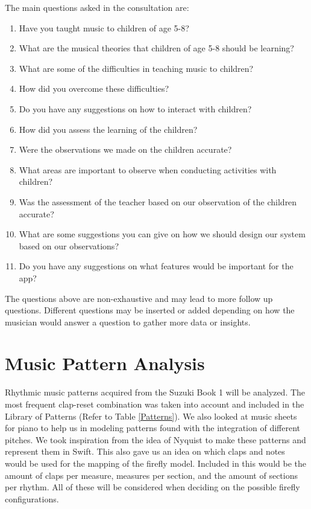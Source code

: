 The main questions asked in the consultation are:
\begin{enumerate}
    \item Have you taught music to children of age 5-8?
    \item What are the musical theories that children of age 5-8 should be learning?
    \item What are some of the difficulties in teaching music to children?
    \item How did you overcome these difficulties?
    \item Do you have any suggestions on how to interact with children?
    \item How did you assess the learning of the children?
    \item Were the observations we made on the children accurate?
    \item What areas are important to observe when conducting activities with children?
    \item Was the assessment of the teacher based on our observation of the children accurate?
    \item What are some suggestions you can give on how we should design our system based on our observations?
    \item Do you have any suggestions on what features would be important for the app?
\end{enumerate}

The questions above are non-exhaustive and may lead to more follow up questions. Different questions may be inserted or added depending on how the musician would answer a question to gather more data or insights.

\section{Music Pattern Analysis}
Rhythmic music patterns acquired from the Suzuki Book 1 will be analyzed. The most frequent clap-reset combination was taken into account and included in the Library of Patterns (Refer to Table \ref{Patterns}). We also looked at music sheets for piano to help us in modeling patterns found with the integration of different pitches. We took inspiration from the idea of Nyquist to make these patterns and represent them in Swift. This also gave us an idea on which claps and notes would be used for the mapping of the firefly model. Included in this would be the amount of claps per measure, measures per section, and the amount of sections per rhythm. All of these will be considered when deciding on the possible firefly configurations.


